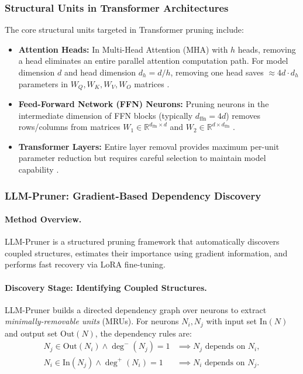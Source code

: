 \subsubsection{Structural Units in Transformer Architectures}

The core structural units targeted in Transformer pruning include:

\begin{itemize}
	\item \textbf{Attention Heads:} In Multi-Head Attention (MHA) with $h$ heads, removing a head eliminates an entire parallel attention computation path. For model dimension $d$ and head dimension $d_h = d/h$, removing one head saves $\approx 4d \cdot d_h$ parameters in $W_Q, W_K, W_V, W_O$ matrices \cite{Michel2019}.
	
	\item \textbf{Feed-Forward Network (FFN) Neurons:} Pruning neurons in the intermediate dimension of FFN blocks (typically $d_{\text{ffn}} = 4d$) removes rows/columns from matrices $W_1 \in \mathbb{R}^{d_{\text{ffn}} \times d}$ and $W_2 \in \mathbb{R}^{d \times d_{\text{ffn}}}$ \cite{kurtic2022optimal}.
	
	\item \textbf{Transformer Layers:} Entire layer removal provides maximum per-unit parameter reduction but requires careful selection to maintain model capability \cite{kim2021learned}.
\end{itemize}

\subsubsection{LLM-Pruner: Gradient-Based Dependency Discovery \cite{ma2023llmpruner}}

\paragraph{Method Overview.} LLM-Pruner \cite{ma2023llmpruner} is a structured pruning framework that automatically discovers coupled structures, estimates their importance using gradient information, and performs fast recovery via LoRA fine-tuning.

\paragraph{Discovery Stage: Identifying Coupled Structures.}
LLM-Pruner builds a directed dependency graph over neurons to extract \emph{minimally-removable units} (MRUs). For neurons $N_i, N_j$ with input set $\mathrm{In}(N)$ and output set $\mathrm{Out}(N)$, the dependency rules are:
\begin{align}
	N_j \in \mathrm{Out}(N_i) \wedge \deg^{-}(N_j)=1 &\implies N_j \text{ depends on } N_i, \label{eq:dep1}\\
	N_i \in \mathrm{In}(N_j) \wedge \deg^{+}(N_i)=1 &\implies N_i \text{ depends on } N_j. \label{eq:dep2}
\end{align}

